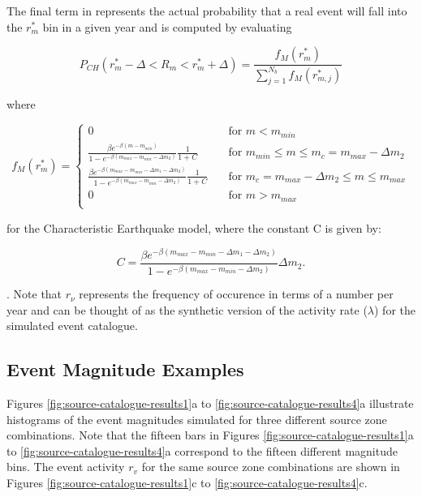 \begin{enumerate}
The final term in 
represents the actual probability that a real event will fall into
the $r_m^*$ bin in a given year and is computed by evaluating

\begin{equation} \label{eq:P_CH}
P_{CH}(r_m^*-\Delta<R_m<r_m^*+\Delta) =
\frac{f_M(r_m^*)}{\sum\limits_{j=1}^{N_b} f_M(r_{m,j}^*)}
\end{equation}

where

\begin{equation} \label{eq:pdf_ch}
f_M(r_m^*) = \left\{
\begin{array}{ll}
0 & \quad \mbox{for $m < m_{min}$} \\
\frac{\beta e ^{- \beta (m-m_{min})}}{1-e^{-\beta (m_{max} - m_{min} - \Delta m_{2})}} \frac{1}{1+C}& \quad \mbox{for $m_{min} \leq m \leq m_{c} = m_{max} - \Delta m_{2}$} \\
\frac{\beta e ^{- \beta (m_{max}-m_{min}-\Delta m_{1} - \Delta m_{2})}}{1-e^{-\beta (m_{max} - m_{min} - \Delta m_{2})}}  \frac{1}{1+C}& \quad \mbox{for $m_{c} = m_{max} - \Delta m_{2} \leq m \leq m_{max}$} \\
0 & \quad \mbox{for $m > m_{max}$} \\ 
\end{array}
 \right. 
\end{equation}

for the Characteristic Earthquake model\citep{eqrm_Schwartz84}, where the constant C is given by:

\begin{equation}
C = \frac{\beta e ^{- \beta (m_{max}-m_{min}-\Delta m_{1} - \Delta m_{2})}}  {1-e^{-\beta (m_{max} - m_{min} - \Delta m_{2})}}  \Delta m_{2} .
\end{equation}


\citep{dr_Kramer96a}. Note that $r_\nu$ represents the frequency of occurence in terms
of a number per year and can be thought of as the synthetic
version of the activity rate ($\lambda$) for the simulated event catalogue.
\end{enumerate}

\subsection{Event Magnitude Examples} 
\label{sec:ev_mag_example}

Figures \ref{fig:source-catalogue-results1}a to \ref{fig:source-catalogue-results4}a
illustrate histograms of the event magnitudes simulated for three
different source zone combinations. Note that the fifteen bars in
Figures \ref{fig:source-catalogue-results1}a to \ref{fig:source-catalogue-results4}a
correspond to the fifteen different magnitude bins. The event
activity $r_v$ for the same source zone combinations are shown in
Figures \ref{fig:source-catalogue-results1}c to \ref{fig:source-catalogue-results4}c.

